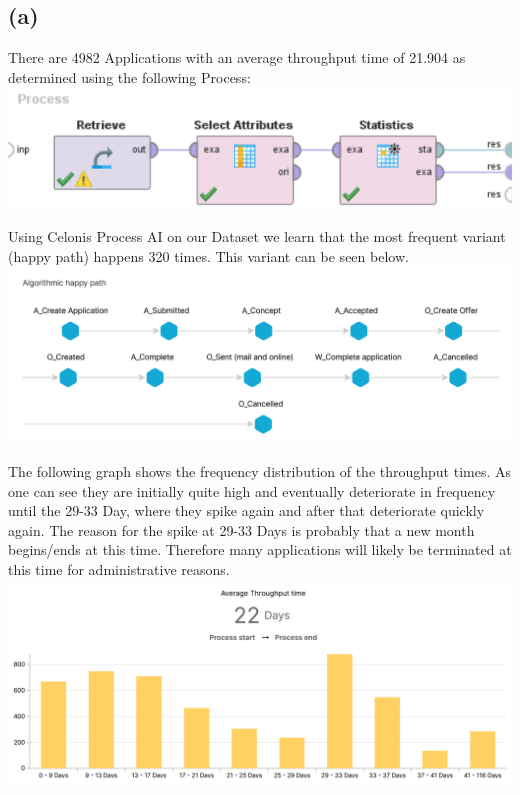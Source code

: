 \documentclass[../../main.tex]{subfiles}
\begin{document}
\subsection*{(a)}
There are 4982 Applications with an average throughput time of 21.904 as determined using the following Process:\\
\includegraphics[width=\textwidth]{img/QUESTION_5a_PROCESS_average_throughput_time.png}

Using Celonis Process AI on our Dataset we learn that the most frequent variant (happy path) happens 320 times. This variant can be seen below.\\
\includegraphics[width=\textwidth]{img/QUESTION_5a_happy_path.png}

The following graph shows the frequency distribution of the throughput times. As one can see they are initially quite high and eventually deteriorate in frequency until the 29-33 Day, where they spike again and after that deteriorate quickly again. The reason for the spike at 29-33 Days is probably that a new month begins/ends at this time. Therefore many applications will likely be terminated at this time for administrative reasons.\\
\includegraphics[width=\textwidth]{img/QUESTION_5a_throughput_time_distribution.png}
\end{document}
